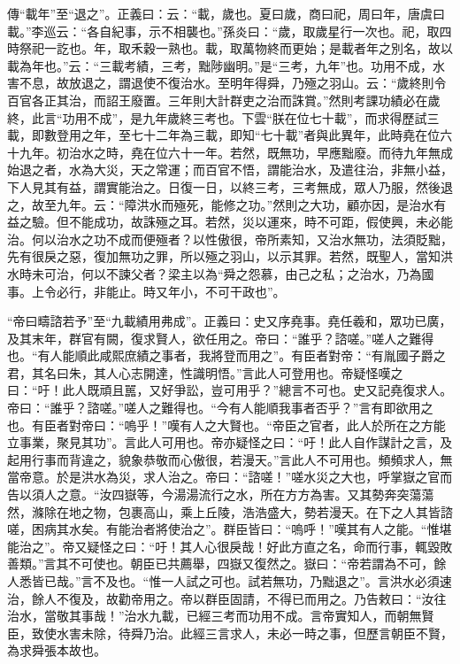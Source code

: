 {\noindent\zhuan{}\fzbyks 傳“載年”至“退之”。正義曰：云：“載，歲也。夏曰歲，商曰祀，周曰年，唐虞曰載。”李巡云：“各自紀事，示不相襲也。”孫炎曰：“歲，取歲星行一次也。祀，取四時祭祀一訖也。年，取禾穀一熟也。載，取萬物終而更始；是載者年之別名，故以載為年也。”云：“三載考績，三考，黜陟幽明。”是“三考，九年”也。功用不成，水害不息，故放退之，謂退使不復治水。至明年得舜，乃殛之羽山。云：“歲終則令百官各正其治，而詔王廢置。三年則大計群吏之治而誅賞。”然則考課功績必在歲終，此言“功用不成”，是九年歲終三考也。下雲“朕在位七十載”，而求得歷試三載，即數登用之年，至七十二年為三載，即知“七十載”者與此異年，此時堯在位六十九年。初治水之時，堯在位六十一年。若然，既無功，早應黜廢。而待九年無成始退之者，水為大災，天之常運；而百官不悟，謂能治水，及遣往治，非無小益，下人見其有益，謂實能治之。日復一日，以終三考，三考無成，眾人乃服，然後退之，故至九年。云：“障洪水而殛死，能修之功。”然則之大功，顧亦因，是治水有益之驗。但不能成功，故誅殛之耳。若然，災以運來，時不可距，假使興，未必能治。何以治水之功不成而便殛者？以性傲很，帝所素知，又治水無功，法須貶黜，先有很戾之惡，復加無功之罪，所以殛之羽山，以示其罪。若然，既聖人，當知洪水時未可治，何以不諫父者？梁主以為“舜之怨慕，由己之私；之治水，乃為國事。上令必行，非能止。時又年小，不可干政也”。 \par}

{\noindent\shu{}\fzkt “帝曰疇諮若予”至“九載績用弗成”。正義曰：史又序堯事。堯任羲和，眾功已廣，及其末年，群官有闕，復求賢人，欲任用之。帝曰：“誰乎？諮嗟。”嗟人之難得也。“有人能順此咸熙庶績之事者，我將登而用之”。有臣者對帝：“有胤國子爵之君，其名曰朱，其人心志開達，性識明悟。”言此人可登用也。帝疑怪嘆之曰：“吁！此人既頑且嚚，又好爭訟，豈可用乎？”總言不可也。史又記堯復求人。帝曰：“誰乎？諮嗟。”嗟人之難得也。“今有人能順我事者否乎？”言有即欲用之也。有臣者對帝曰：“嗚乎！”嘆有人之大賢也。“帝臣之官者，此人於所在之方能立事業，聚見其功”。言此人可用也。帝亦疑怪之曰：“吁！此人自作謀計之言，及起用行事而背違之，貌象恭敬而心傲很，若漫天。”言此人不可用也。頻頻求人，無當帝意。於是洪水為災，求人治之。帝曰：“諮嗟！”嗟水災之大也，呼掌嶽之官而告以須人之意。“汝四嶽等，今湯湯流行之水，所在方方為害。又其勢奔突蕩蕩然，滌除在地之物，包裹高山，乘上丘陵，浩浩盛大，勢若漫天。在下之人其皆諮嗟，困病其水矣。有能治者將使治之”。群臣皆曰：“嗚呼！”嘆其有人之能。“惟堪能治之”。帝又疑怪之曰：“吁！其人心很戾哉！好此方直之名，命而行事，輒毀敗善類。”言其不可使也。朝臣已共薦舉，四嶽又復然之。嶽曰：“帝若謂為不可，餘人悉皆已哉。”言不及也。“惟一人試之可也。試若無功，乃黜退之”。言洪水必須速治，餘人不復及，故勸帝用之。帝以群臣固請，不得已而用之。乃告敕曰：“汝往治水，當敬其事哉！”治水九載，已經三考而功用不成。言帝實知人，而朝無賢臣，致使水害未除，待舜乃治。此經三言求人，未必一時之事，但歷言朝臣不賢，為求舜張本故也。 \par}


